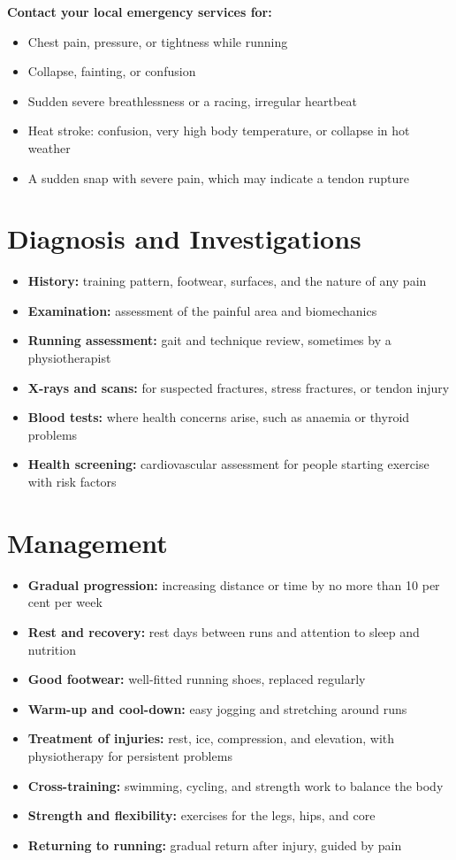 \textbf{Contact your local emergency services for:}
\begin{itemize}
    \item Chest pain, pressure, or tightness while running
    \item Collapse, fainting, or confusion
    \item Sudden severe breathlessness or a racing, irregular heartbeat
    \item Heat stroke: confusion, very high body temperature, or collapse in hot weather
    \item A sudden snap with severe pain, which may indicate a tendon rupture
\end{itemize}

\section*{Diagnosis and Investigations}
\begin{itemize}
    \item \textbf{History:} training pattern, footwear, surfaces, and the nature of any pain
    \item \textbf{Examination:} assessment of the painful area and biomechanics
    \item \textbf{Running assessment:} gait and technique review, sometimes by a physiotherapist
    \item \textbf{X-rays and scans:} for suspected fractures, stress fractures, or tendon injury
    \item \textbf{Blood tests:} where health concerns arise, such as anaemia or thyroid problems
    \item \textbf{Health screening:} cardiovascular assessment for people starting exercise with risk factors
\end{itemize}

\section*{Management}
\begin{itemize}
    \item \textbf{Gradual progression:} increasing distance or time by no more than 10 per cent per week
    \item \textbf{Rest and recovery:} rest days between runs and attention to sleep and nutrition
    \item \textbf{Good footwear:} well-fitted running shoes, replaced regularly
    \item \textbf{Warm-up and cool-down:} easy jogging and stretching around runs
    \item \textbf{Treatment of injuries:} rest, ice, compression, and elevation, with physiotherapy for persistent problems
    \item \textbf{Cross-training:} swimming, cycling, and strength work to balance the body
    \item \textbf{Strength and flexibility:} exercises for the legs, hips, and core
    \item \textbf{Returning to running:} gradual return after injury, guided by pain
\end{itemize}

